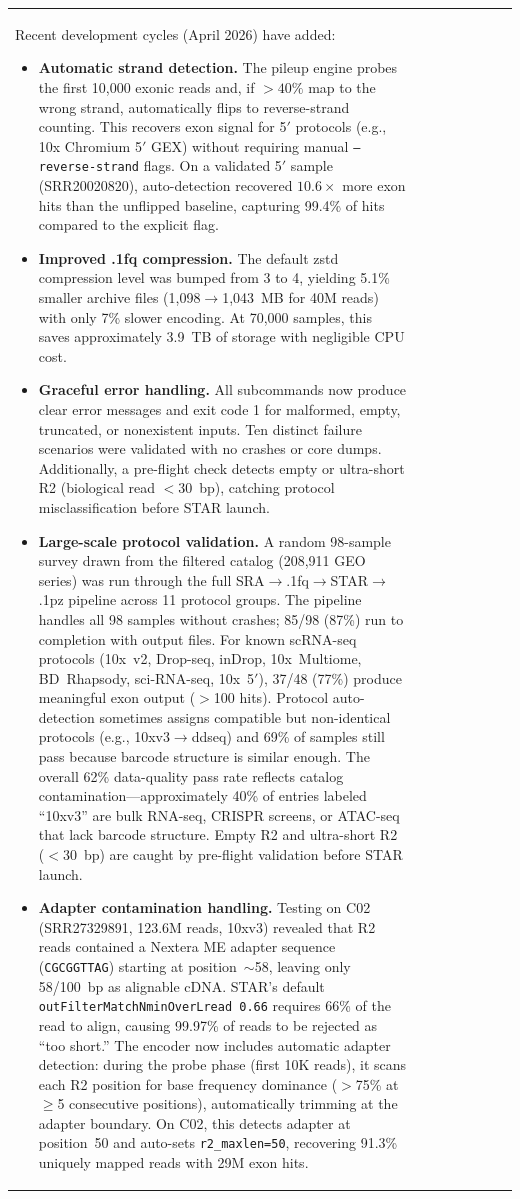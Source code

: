 \documentclass[11pt,a4paper]{article}
\begin{document}
\begin{table}[t]
\begin{tabular}{llllrrrr}
{Recent development cycles (April 2026) have added:
\begin{itemize}
    \item \textbf{Automatic strand detection.} The pileup engine probes the first 10,000 exonic reads and, if $>40\%$ map to the wrong strand, automatically flips to reverse-strand counting. This recovers exon signal for 5$'$ protocols (e.g., 10x Chromium 5$'$ GEX) without requiring manual \texttt{--reverse-strand} flags. On a validated 5$'$ sample (SRR20020820), auto-detection recovered $10.6\times$ more exon hits than the unflipped baseline, capturing 99.4\% of hits compared to the explicit flag.
    \item \textbf{Improved .1fq compression.} The default zstd compression level was bumped from 3 to 4, yielding 5.1\% smaller archive files (1,098$\to$1,043~MB for 40M reads) with only 7\% slower encoding. At 70,000 samples, this saves approximately 3.9~TB of storage with negligible CPU cost.
    \item \textbf{Graceful error handling.} All subcommands now produce clear error messages and exit code 1 for malformed, empty, truncated, or nonexistent inputs. Ten distinct failure scenarios were validated with no crashes or core dumps. Additionally, a pre-flight check detects empty or ultra-short R2 (biological read $<30$~bp), catching protocol misclassification before STAR launch.
    \item \textbf{Large-scale protocol validation.} A random 98-sample survey drawn from the filtered catalog (208,911 GEO series) was run through the full SRA$\to$.1fq$\to$STAR$\to$.1pz pipeline across 11 protocol groups. The pipeline handles all 98 samples without crashes; 85/98 (87\%) run to completion with output files. For known scRNA-seq protocols (10x~v2, Drop-seq, inDrop, 10x~Multiome, BD~Rhapsody, sci-RNA-seq, 10x~5$'$), 37/48 (77\%) produce meaningful exon output ($>$100 hits). Protocol auto-detection sometimes assigns compatible but non-identical protocols (e.g., 10xv3$\to$ddseq) and 69\% of samples still pass because barcode structure is similar enough. The overall 62\% data-quality pass rate reflects catalog contamination---approximately 40\% of entries labeled ``10xv3'' are bulk RNA-seq, CRISPR screens, or ATAC-seq that lack barcode structure. Empty R2 and ultra-short R2 ($<$30~bp) are caught by pre-flight validation before STAR launch.
    \item \textbf{Adapter contamination handling.} Testing on C02 (SRR27329891, 123.6M reads, 10xv3) revealed that R2 reads contained a Nextera ME adapter sequence (\texttt{CGCGGTTAG}) starting at position~$\sim$58, leaving only 58/100~bp as alignable cDNA. STAR's default \texttt{outFilterMatchNminOverLread~0.66} requires 66\% of the read to align, causing 99.97\% of reads to be rejected as ``too short.'' The encoder now includes automatic adapter detection: during the probe phase (first 10K reads), it scans each R2 position for base frequency dominance ($>$75\% at $\geq$5 consecutive positions), automatically trimming at the adapter boundary. On C02, this detects adapter at position~50 and auto-sets \texttt{r2\_maxlen=50}, recovering 91.3\% uniquely mapped reads with 29M exon hits.

\end{itemize}}
\end{tabular}
\end{table}
\end{document}
